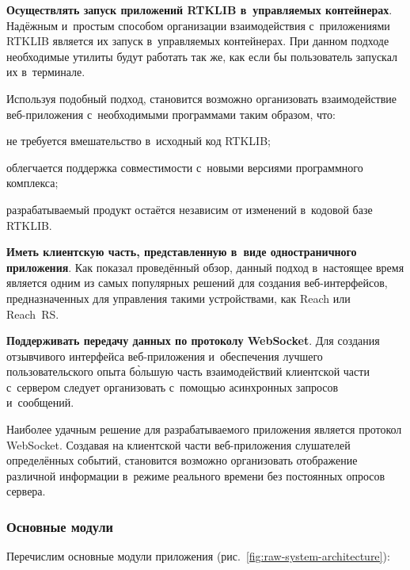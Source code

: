 \documentclass[pta]{../../../scs-iam}
\begin{document}
\begin{dashitemize}
  \item \textbf{Осуществлять запуск приложений RTKLIB в~управляемых контейнерах}. Надёжным и~простым способом организации взаимодействия с~приложениями RTKLIB является их запуск в~управляемых контейнерах. При данном подходе необходимые утилиты будут работать так же, как если бы пользователь запускал их в~терминале.

  Используя подобный подход, становится возможно организовать взаимодействие веб-приложения с~необходимыми программами таким образом, что:

  \begin{dashitemize}
    \item не требуется вмешательство в~исходный код RTKLIB;
    \item облегчается поддержка совместимости с~новыми версиями программного комплекса;
    \item разрабатываемый продукт остаётся независим от изменений в~кодовой базе RTKLIB. 
  \end{dashitemize}

  \item \textbf{Иметь клиентскую часть, представленную в~виде одностраничного приложения}. Как показал проведённый обзор, данный подход в~настоящее время является одним из самых популярных решений для создания веб-интерфейсов, предназначенных для управления такими устройствами, как Reach или Reach~RS.

  \item \textbf{Поддерживать передачу данных по протоколу WebSocket}. Для создания отзывчивого интерфейса веб-приложения и~обеспечения лучшего пользовательского опыта б\`{о}льшую часть взаимодействий клиентской части с~сервером следует организовать с~помощью асинхронных запросов и~сообщений.

  Наиболее удачным решение для разрабатываемого приложения является протокол WebSocket. Создавая на клиентской части веб-приложения слушателей определённых событий, становится возможно организовать отображение различной информации в~режиме реального времени без постоянных опросов сервера.
\end{dashitemize}

\subsubsection{Основные модули}

Перечислим основные модули приложения (рис.~\ref{fig:raw-system-architecture}):
\end{document}
